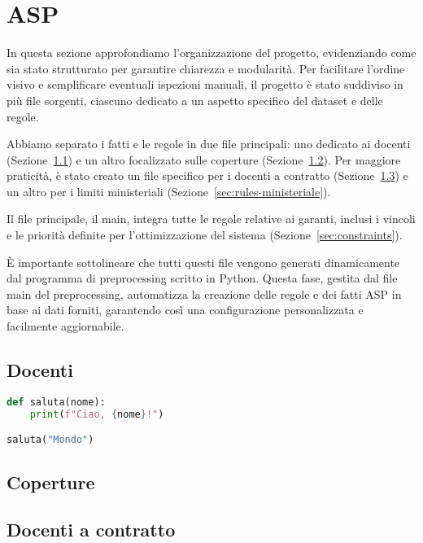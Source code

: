\section{ASP}\label{sec:asp}

In questa sezione approfondiamo l'organizzazione del progetto, evidenziando 
come sia stato strutturato per garantire chiarezza e modularità. 
Per facilitare l'ordine visivo e semplificare eventuali ispezioni manuali, 
il progetto è stato suddiviso in più file sorgenti, ciascuno dedicato a un 
aspetto specifico del dataset e delle regole.

Abbiamo separato i fatti e le regole in due file principali: uno dedicato 
ai docenti (Sezione~\ref*{sec:rules-docenti}) e un altro focalizzato sulle 
coperture (Sezione~\ref*{sec:rules-coperture}). Per maggiore praticità, è 
stato creato un file specifico per i docenti a contratto 
(Sezione~\ref*{sec:rules-docenti-contratto}) e un altro per i limiti 
ministeriali (Sezione~\ref*{sec:rules-ministeriale}).

Il file principale, il main, integra tutte le regole relative ai garanti, 
inclusi i vincoli e le priorità definite per l'ottimizzazione del sistema 
(Sezione~\ref*{sec:constraints}).

È importante sottolineare che tutti questi file vengono generati dinamicamente 
dal programma di preprocessing scritto in Python. Questa fase, gestita dal 
file main del preprocessing, automatizza la creazione delle regole e dei 
fatti ASP in base ai dati forniti, garantendo così una configurazione 
personalizzata e facilmente aggiornabile. 


\subsection{Docenti}\label{sec:rules-docenti}



\begin{lstlisting}[language=Python, caption={Esempio di codice Python}]
def saluta(nome):
    print(f"Ciao, {nome}!")

saluta("Mondo")
\end{lstlisting}


\subsection{Coperture}\label{sec:rules-coperture}
\subsection{Docenti a contratto}\label{sec:rules-docenti-contratto}
